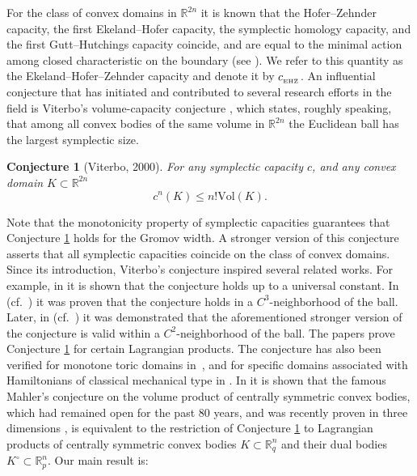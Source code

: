 \documentclass[10pt,a4paper]{article}
\newtheorem{conjecture}[theorem]{Conjecture}
\theoremstyle{definition}
\newcommand{\R}{{\mathbb{R}}}
\newcommand{\ehzcap}{c_{_{\rm EHZ}}}
\begin{document}
\medskip

For the class of convex domains in $\R^{2n}$ it is known that the Hofer--Zehnder capacity, the first Ekeland--Hofer capacity, the symplectic homology capacity, and the first Gutt--Hutchings capacity coincide, and are equal to the minimal action among closed characteristic on the boundary (see \cite{hofer-zehnder, hofer-ekeland, viterbo_cap, irie, abbondandolo-kang, Gu-Ha, ginzburg-shon, gutt-hutchings-ramos}). We refer to this quantity as the Ekeland--Hofer--Zehnder capacity and denote it by $\ehzcap$. An influential conjecture that has initiated and contributed to several research efforts in the field is Viterbo's volume-capacity conjecture \cite{viterbo2000}, which states, roughly speaking, that among all convex bodies of the same volume in $\R^{2n}$ the Euclidean ball has the largest symplectic size.
 \begin{conjecture}[Viterbo, 2000]
\label{viterbo_conj}
For any symplectic capacity $c$, and any convex domain $K \subset \R^{2n}$
$$ c^n(K) \leq n! \text{Vol}(K).$$
\end{conjecture}
Note that the monotonicity property of symplectic capacities guarantees that 
Conjecture \ref{viterbo_conj} holds for the Gromov width.
A stronger version of this conjecture asserts that all symplectic capacities coincide on the class of convex domains.
Since its introduction, Viterbo's conjecture inspired several related works. For example, in \cite{ArtsteinAvidanOstroverMilman} it is shown that the conjecture holds up to a universal constant. 
In \cite{abhs} (cf.~\cite{abbondandoloBenedetti}) it was proven that the conjecture holds
in a $C^3$-neighborhood of the 
ball. Later, in \cite{edtmair} (cf.~\cite{abbondandolo-benedetti-edtmair}) 
it was demonstrated that the aforementioned stronger version of the conjecture is valid within a 
$C^2$-neighborhood of the ball.
The papers \cite{balitsky, rudolf} prove Conjecture \ref{viterbo_conj} for certain Lagrangian products. %
The conjecture has also been verified for  monotone toric domains in~\cite{gutt-hutchings-ramos}, and for specific domains associated with Hamiltonians of classical mechanical type in 
\cite{karasev-sharipova}.
In \cite{capacity_mahler} it is shown that the famous Mahler's conjecture on the volume product of centrally symmetric convex bodies, which had remained open for the past 80 years, and was recently proven in three dimensions \cite{mahler3dim}, is equivalent to the restriction of Conjecture \ref{viterbo_conj} to Lagrangian products of centrally symmetric convex bodies $K \subset \R^n_q$ and their dual bodies  $K^\circ \subset \R^n_p$.  
Our main result is:
\end{document}
